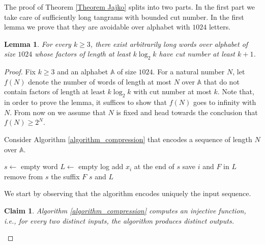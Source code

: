\documentclass[12pt]{amsart}
\theoremstyle{plain}
\newtheorem{claim}{Claim}
\newtheorem{lemma}{Lemma}
\numberwithin{equation}{section}
\begin{document}
	The proof of Theorem \ref{Theorem Jajko} splits into two parts. In the first part we take care of sufficiently long tangrams with bounded cut number. In the first lemma we prove that they are avoidable over alphabet with $1024$ letters.
\begin{lemma}\label{lemma_avoid_long_tangrams}
	For every $k \geqslant 3$, there exist arbitrarily long words over alphabet of size $1024$ whose factors of length at least $k\log_2 k$ have cut number at least $k+1$.
\end{lemma}
\begin{proof}
	Fix $k\geqslant 3$ and an alphabet $\mathbb{A}$ of size $1024$. For a natural number $N$, let $f(N)$ denote the number of words of length at most $N$ over $\mathbb{A}$ that do not contain factors of length at least $k\log_2 k$ with cut number at most $k$. Note that, in order to prove the lemma, it suffices to show that $f(N)$ goes to infinity with $N$. From now on we assume that $N$ is fixed and head towards the conclusion that $f(N)\geqslant 2^N$.
	
	Consider Algorithm \ref{algorithm_compression} that encodes a sequence of length $N$ over $\mathbb{A}$.
	
	\begin{algorithm}
		\caption{Encoding of a sequence of length $n$ over some alphabet $\mathbb{A}$ of size $1024$.}
		\label{algorithm_compression}
		\begin{algorithmic}[1]
			\State $s \leftarrow $ empty word
			\State $L \leftarrow $ empty log
			\State\label{step_add_letter} add $x_i$ at the end of $s$
			\label{step_erasurecondition}
			\State\label{step_information_saved} save $i$ and $F$ in $L$
			\State\label{step_remove_tangram} remove from $s$ the suffix $F$
			\EndIf
			\EndFor
			\State\Return $s$ and $L$
			\EndProcedure
		\end{algorithmic}
	\end{algorithm}
	
	We start by observing that the algorithm encodes uniquely the input sequence.
	
	\begin{claim}
		\label{claim_injective_function}
		Algorithm \ref{algorithm_compression} computes an injective function, i.e., for every two distinct inputs, the algorithm produces distinct outputs.
	\end{claim}
	

\end{proof}
\end{document}
